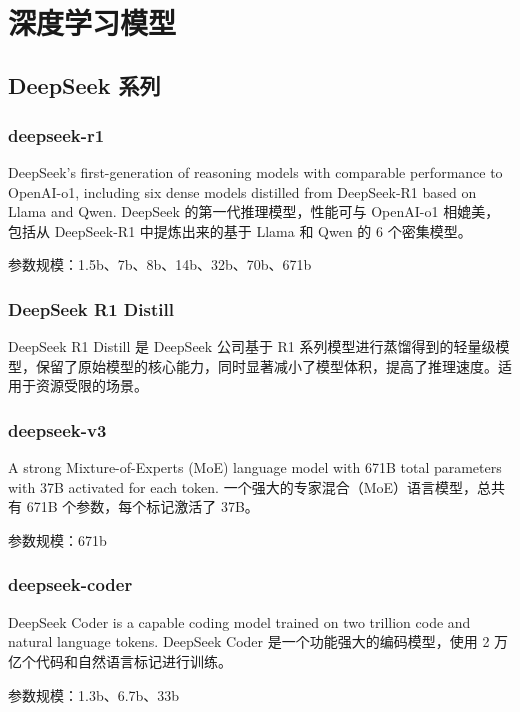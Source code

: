 \documentclass[12pt,UTF8]{ctexbook}
\begin{document}
~\\

\chapter{深度学习模型}

\section{DeepSeek 系列}

\subsection{deepseek-r1}

DeepSeek's first-generation of reasoning models with comparable performance to OpenAI-o1, including six dense models distilled from DeepSeek-R1 based on Llama and Qwen.
DeepSeek 的第一代推理模型，性能可与 OpenAI-o1 相媲美，包括从 DeepSeek-R1 中提炼出来的基于 Llama 和 Qwen 的 6 个密集模型。

参数规模：1.5b、7b、8b、14b、32b、70b、671b

\subsection{DeepSeek R1 Distill}

DeepSeek R1 Distill 是 DeepSeek 公司基于 R1 系列模型进行蒸馏得到的轻量级模型，保留了原始模型的核心能力，同时显著减小了模型体积，提高了推理速度。适用于资源受限的场景。

\subsection{deepseek-v3}

A strong Mixture-of-Experts (MoE) language model with 671B total parameters with 37B activated for each token.
一个强大的专家混合（MoE）语言模型，总共有 671B 个参数，每个标记激活了 37B。

参数规模：671b

\subsection{deepseek-coder}

DeepSeek Coder is a capable coding model trained on two trillion code and natural language tokens.
DeepSeek Coder 是一个功能强大的编码模型，使用 2 万亿个代码和自然语言标记进行训练。

参数规模：1.3b、6.7b、33b
\end{document}
